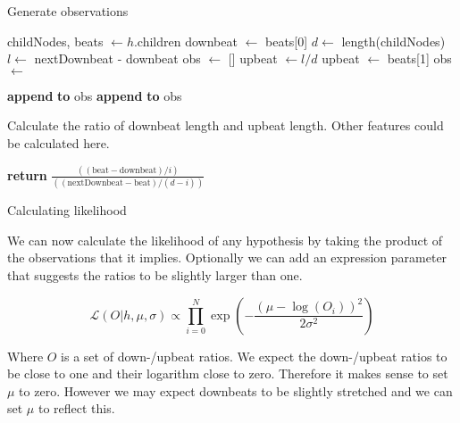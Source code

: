 \begin{algorithm}
\caption{Generate observations}
\label{alg:observations}
\begin{algorithmic}
	\State childNodes, beats $\leftarrow h$.children
		\State downbeat $\leftarrow$ beats[0]
	\EndIf
	\State $d \leftarrow$ length(childNodes)
	\State $l \leftarrow$ nextDownbeat - downbeat
	\State obs $\leftarrow$ []
		\State upbeat $\leftarrow l/d$
			\State upbeat $\leftarrow$ beats[1]
		\EndIf
		\State obs $\leftarrow$ 
	\EndIf
	
			\State \textbf{append}  \textbf{to} obs
		\EndIf	
			\State \textbf{append}  \textbf{to} obs
		\EndIf
	\EndFor
\EndFunction
\end{algorithmic}
\end{algorithm}

\begin{algorithm}
\caption{Calculate the ratio of downbeat length and upbeat length. Other features could be calculated here.}
\label{alg:features}
\begin{algorithmic}
	\State \textbf{return} $\frac{((\mathrm{beat} - \mathrm{downbeat}) / i)}{((\mathrm{nextDownbeat} - \mathrm{beat}) / (d - i))}$
\EndFunction
\end{algorithmic}
\end{algorithm}

Calculating likelihood

We can now calculate the likelihood of any hypothesis by taking the product of the observations that it implies. Optionally we can add an expression parameter that suggests the ratios to be slightly larger than one.

\begin{equation}
\label{eq:h_likelihood}
\mathcal{L}(O|h, \mu, \sigma) \propto \prod_{i=0}^N \exp\left(-\frac{(\mu - \log(O_i))^2}{2\sigma^2}\right)
\end{equation}

Where $O$ is a set of down-/upbeat ratios. We expect the down-/upbeat ratios to be close to one and their logarithm close to zero. Therefore it makes sense to set $\mu$ to zero. However we may expect downbeats to be slightly stretched and we can set $\mu$ to reflect this.

